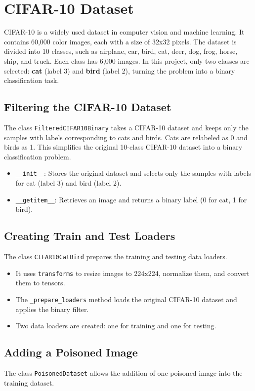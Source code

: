 \section{CIFAR-10 Dataset}
CIFAR-10 is a widely used dataset in computer vision and machine learning. It contains 60,000 color images, each with a size of 32x32 pixels. The dataset is divided into 10 classes, such as airplane, car, bird, cat, deer, dog, frog, horse, ship, and truck. Each class has 6,000 images. In this project, only two classes are selected: \textbf{cat} (label 3) and \textbf{bird} (label 2), turning the problem into a binary classification task.

\subsection{Filtering the CIFAR-10 Dataset}
The class \texttt{FilteredCIFAR10Binary} takes a CIFAR-10 dataset and keeps only the samples with labels corresponding to cats and birds. 
Cats are relabeled as 0 and birds as 1. This simplifies the original 10-class CIFAR-10 dataset into a binary classification problem.
\begin{itemize}
    \item \texttt{\_\_init\_\_}: Stores the original dataset and selects only the samples with labels for cat (label 3) and bird (label 2).
    \item \texttt{\_\_getitem\_\_}: Retrieves an image and returns a binary label (0 for cat, 1 for bird).
\end{itemize}

\subsection{Creating Train and Test Loaders}
The class \texttt{CIFAR10CatBird} prepares the training and testing data loaders.

\begin{itemize}
    \item It uses \texttt{transforms} to resize images to 224x224, normalize them, and convert them to tensors.
    \item The \texttt{\_prepare\_loaders} method loads the original CIFAR-10 dataset and applies the binary filter.
    \item Two data loaders are created: one for training and one for testing.
\end{itemize}

\subsection{Adding a Poisoned Image}
The class \texttt{PoisonedDataset} allows the addition of one poisoned image into the training dataset.